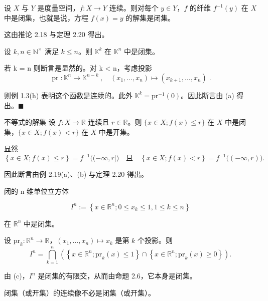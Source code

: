 \begin{example}

\begin{items}
\item

设 $X$ 与 $Y$ 是度量空间，$f: X \to Y$ 连续。则对每个 $y \in Y$，$f$ 的纤维 $f^{-1}(y)$ 在 $X$ 中是闭集，也就是说，方程 $f(x) = y$ 的解集是闭集。

\proofhead
这由推论 2.18 与定理 2.20 得出。
\item

设 $ k, n \in \mathbb{N}^\times $ 满足 $ k \leq n $。则 $ \mathbb{K}^k $ 在 $ \mathbb{K}^n $ 中是闭集。

\proofhead
若 k = n 则断言是显然的。对 k < n，考虑投影
\[
\operatorname{pr}\colon\mathbb{K}^{n}\to\mathbb{K}^{n-k}~,\quad\left(x_{1},\ldots,x_{n}\right)\mapsto\left(x_{k+1},\ldots,x_{n}\right)\;.
\]

则例 1.3(h) 表明这个函数是连续的。此外 $ \mathbb{K}^k = \mathrm{pr}^{-1}(0) $。因此断言由 (a) 得出。$ \blacksquare $

\item

不等式的解集 设 $ f: X \to \mathbb{R} $ 连续且 $ r \in \mathbb{R} $。则 $ \{x \in X; f(x) \leq r\} $ 在 $ X $ 中是闭集，$ \{x \in X; f(x) < r\} $ 在 $ X $ 中是开集。

\proofhead
显然
\[
\left\{x\in X;f(x)\leq r\right\}=f^{-1}\big((-\infty,r]\big)\quad\text{且}\quad\left\{x\in X;f(x)<r\right\}=f^{-1}\big((-\infty,r)\big).
\]

因此断言由例 2.19(a)、(b) 与定理 2.20 得出。

\item

闭的 n 维单位立方体

\[
I^{n}:=\left\{x\in\mathbb{R}^{n};0\leq x_{k}\leq1,1\leq k\leq n\right\}
\]

在 $ \mathbb{R}^{n} $ 中是闭集。

\proofhead
设 $ \mathrm{pr}_k: \mathbb{R}^n \to \mathbb{R} $，$ (x_1, \ldots, x_n) \mapsto x_k $ 是第 $ k $ 个投影。则
\[
I^{n}=\bigcap_{k=1}^{n}\left(\left\{x\in\mathbb{R}^{n} ;\mathrm{pr}_{k}(x)\leq1\right\}\cap\left\{x\in\mathbb{R}^{n} ;\mathrm{pr}_{k}(x)\geq0\right\}\right).
\]

由 (c)，$ I^{n} $ 是闭集的有限交，从而由命题 2.6，它本身是闭集。

\item

闭集（或开集）的连续像不必是闭集（或开集）。


\end{items}
\end{example}
